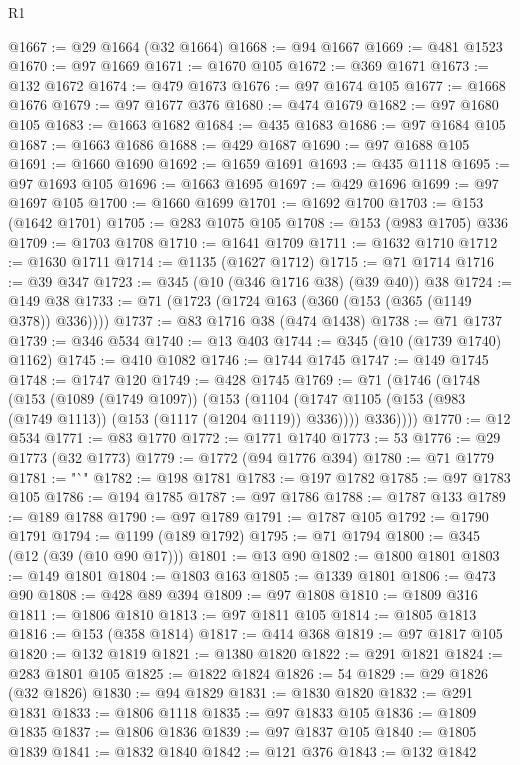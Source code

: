 \begin{lexlean}{R1}
\begin{coremodule}
{{{{{{{{{{{{{{{{{{{{{{{{{{{{{{{{{{{{{{{{{{{{{{{{{{{{{{{{{{{{{{{{{{{{{{{{{{{{{{{{{{{{{{{{{{{{{{{{{{{{{{{{{{{{{{{{{{{{{{{{{{{{{{{{{{{{{{{{{{{{{{{{{{{{{{{{{{{{{{{{{{{{{{{{{{{{{{{{{{{{{{{{{{@1667 := @29 @1664 (@32 @1664)
@1668 := @94 @1667
@1669 := @481 @1523
@1670 := @97 @1669
@1671 := @1670 @105
@1672 := @369 @1671
@1673 := @132 @1672
@1674 := @479 @1673
@1676 := @97 @1674 @105
@1677 := @1668 @1676
@1679 := @97 @1677 @376
@1680 := @474 @1679
@1682 := @97 @1680 @105
@1683 := @1663 @1682
@1684 := @435 @1683
@1686 := @97 @1684 @105
@1687 := @1663 @1686
@1688 := @429 @1687
@1690 := @97 @1688 @105
@1691 := @1660 @1690
@1692 := @1659 @1691
@1693 := @435 @1118
@1695 := @97 @1693 @105
@1696 := @1663 @1695
@1697 := @429 @1696
@1699 := @97 @1697 @105
@1700 := @1660 @1699
@1701 := @1692 @1700
@1703 := @153 (@1642 @1701)
@1705 := @283 @1075 @105
@1708 := @153 (@983 @1705) @336
@1709 := @1703 @1708
@1710 := @1641 @1709
@1711 := @1632 @1710
@1712 := @1630 @1711
@1714 := @1135 (@1627 @1712)
@1715 := @71 @1714
@1716 := @39 @347
@1723 := @345 (@10 (@346 @1716 @38) (@39 @40)) @38
@1724 := @149 @38
@1733 := @71 (@1723 (@1724 @163 (@360 (@153 (@365 (@1149 @378)) @336))))
@1737 := @83 @1716 @38 (@474 @1438)
@1738 := @71 @1737
@1739 := @346 @534
@1740 := @13 @403
@1744 := @345 (@10 (@1739 @1740) @1162)
@1745 := @410 @1082
@1746 := @1744 @1745
@1747 := @149 @1745
@1748 := @1747 @120
@1749 := @428 @1745
@1769 := @71
    (@1746
      (@1748
        (@153
          (@1089 (@1749 @1097))
          (@153
            (@1104 (@1747 @1105 (@153 (@983 (@1749 @1113)) (@153 (@1117 (@1204 @1119)) @336))))
            @336))))
@1770 := @12 @534
@1771 := @83 @1770
@1772 := @1771 @1740
@1773 := 53
@1776 := @29 @1773 (@32 @1773)
@1779 := @1772 (@94 @1776 @394)
@1780 := @71 @1779
@1781 := "`"
@1782 := @198 @1781
@1783 := @197 @1782
@1785 := @97 @1783 @105
@1786 := @194 @1785
@1787 := @97 @1786
@1788 := @1787 @133
@1789 := @189 @1788
@1790 := @97 @1789
@1791 := @1787 @105
@1792 := @1790 @1791
@1794 := @1199 (@189 @1792)
@1795 := @71 @1794
@1800 := @345 (@12 (@39 (@10 @90 @17)))
@1801 := @13 @90
@1802 := @1800 @1801
@1803 := @149 @1801
@1804 := @1803 @163
@1805 := @1339 @1801
@1806 := @473 @90
@1808 := @428 @89 @394
@1809 := @97 @1808
@1810 := @1809 @316
@1811 := @1806 @1810
@1813 := @97 @1811 @105
@1814 := @1805 @1813
@1816 := @153 (@358 @1814)
@1817 := @414 @368
@1819 := @97 @1817 @105
@1820 := @132 @1819
@1821 := @1380 @1820
@1822 := @291 @1821
@1824 := @283 @1801 @105
@1825 := @1822 @1824
@1826 := 54
@1829 := @29 @1826 (@32 @1826)
@1830 := @94 @1829
@1831 := @1830 @1820
@1832 := @291 @1831
@1833 := @1806 @1118
@1835 := @97 @1833 @105
@1836 := @1809 @1835
@1837 := @1806 @1836
@1839 := @97 @1837 @105
@1840 := @1805 @1839
@1841 := @1832 @1840
@1842 := @121 @376
@1843 := @132 @1842
}}}}}}}}}}}}}}}}}}}}}}}}}}}}}}}}}}}}}}}}}}}}}}}}}}}}}}}}}}}}}}}}}}}}}}}}}}}}}}}}}}}}}}}}}}}}}}}}}}}}}}}}}}}}}}}}}}}}}}}}}}}}}}}}}}}}}}}}}}}}}}}}}}}}}}}}}}}}}}}}}}}}}}}}}}}}}}}}}}}}}}}}}}
\end{coremodule}
\end{lexlean}

